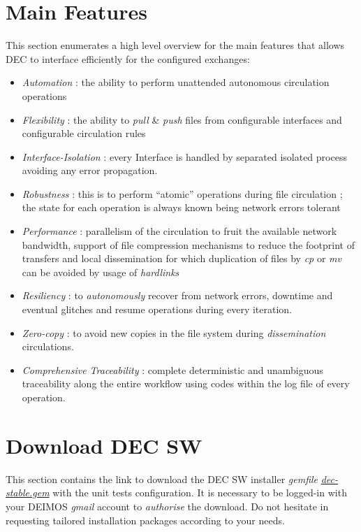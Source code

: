 \documentclass[dec_sum_main.tex]{subfiles}
\begin{document}
\section{Main Features}
This section enumerates a high level overview for the main features that allows DEC to interface efficiently for the configured exchanges:

\begin{itemize}
	\item \textit{Automation} : the ability to perform unattended autonomous circulation operations
	\item \textit{Flexibility} : the ability to \textit{pull} \& \textit{push} files from configurable interfaces and configurable circulation rules
	\item \textit{Interface-Isolation} : every Interface is handled by separated isolated process avoiding any error propagation.
	\item \textit{Robustness} : this is to perform “atomic” operations during file circulation ; the state for each operation is always known being network errors tolerant
	\item \textit{Performance} : parallelism of the circulation to fruit the available network bandwidth, support of file compression mechanisms to reduce the footprint of transfers and local dissemination for which duplication of files by \textit{cp} or \textit{mv} can be avoided by usage of \textit{hardlinks}
	\item \textit{Resiliency} : to \textit{autonomously} recover from network errors, downtime and eventual glitches and resume operations during every iteration.
	\item \textit{Zero-copy} : to avoid new copies in the file system during \textit{dissemination} circulations.	
	\item \textit{Comprehensive Traceability} : complete deterministic and unambiguous traceability along the entire workflow using codes within the log file of every operation.	
\end{itemize}

\section{Download DEC SW}
This section contains the link to download the DEC SW installer \textit{gemfile} \href{https://drive.google.com/uc?export=download&id=1gieDRpDEBzKv5Xr0qwPvBz34RHphTnQq}{\textit{dec-stable.gem}} with the unit tests configuration. It is necessary to be logged-in with your DEIMOS \textit{gmail} account to \textit{authorise} the download. Do not hesitate in requesting tailored installation packages according to your needs.

\par
\noindent
\end{document}
